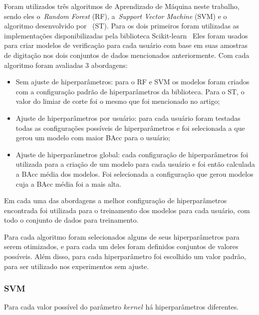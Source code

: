 Foram utilizados três algoritmos de Aprendizado de Máquina neste trabalho, sendo eles o~\textit{Random Forest} (RF), a~\textit{Support Vector Machine} (SVM) e o algoritmo desenvolvido por~ (ST). Para os dois primeiros foram utilizadas as implementações disponibilizadas pela biblioteca Scikit-learn~\cite{scikit-learn} Eles foram usados para criar modelos de verificação para cada usuário com base em suas amostras de digitação nos dois conjuntos de dados mencionados anteriormente. Com cada algoritmo foram avaliadas 3 abordagens:

\begin{itemize}
    \item Sem ajuste de hiperparâmetros: para o RF e SVM os modelos foram criados com a configuração padrão de hiperparâmetros da biblioteca. Para o ST, o valor do limiar de corte foi o mesmo que foi mencionado no artigo;
    \item Ajuste de hiperparâmetros por usuário: para cada usuário foram testadas todas as configurações possíveis de hiperparâmetros e foi selecionada a que gerou um modelo com maior BAcc para o usuário;
    \item Ajuste de hiperparâmetros global: cada configuração de hiperparâmetros foi utilizada para a criação de um modelo para cada usuário e foi então calculada a BAcc média dos modelos. Foi selecionada a configuração que gerou modelos cuja a BAcc média foi a mais alta. 
\end{itemize}

Em cada uma das abordagens a melhor configuração de hiperparâmetros encontrada foi utilizada para o treinamento dos modelos para cada usuário, com todo o conjunto de dados para treinamento.

Para cada algoritmo foram selecionados alguns de seus hiperparâmetros para serem otimizados, e para cada um deles foram definidos conjuntos de valores possíveis. Além disso, para cada hiperparâmetro foi escolhido um valor padrão, para ser utilizado nos experimentos sem ajuste.


\subsubsection{SVM}\label{subsubsec:svm_hps}

Para cada valor possível do parâmetro $kernel$ há hiperparâmetros diferentes.

